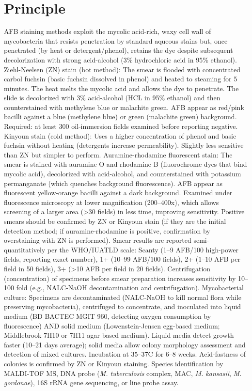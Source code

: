 \section*{Principle}
AFB staining methods exploit the mycolic acid-rich, waxy cell wall of mycobacteria that resists penetration by standard aqueous stains but, once penetrated (by heat or detergent/phenol), retains the dye despite subsequent decolorization with strong acid-alcohol (3\% hydrochloric acid in 95\% ethanol). Ziehl-Neelsen (ZN) stain (hot method): The smear is flooded with concentrated carbol fuchsin (basic fuchsin dissolved in phenol) and heated to steaming for 5 minutes. The heat melts the mycolic acid and allows the dye to penetrate. The slide is decolorized with 3\% acid-alcohol (HCL in 95\% ethanol) and then counterstained with methylene blue or malachite green. AFB appear as red/pink bacilli against a blue (methylene blue) or green (malachite green) background. Required: at least 300 oil-immersion fields examined before reporting negative. Kinyoun stain (cold method): Uses a higher concentration of phenol and basic fuchsin without heating (detergents increase permeability). Slightly less sensitive than ZN but simpler to perform. Auramine-rhodamine fluorescent stain: The smear is stained with auramine O and rhodamine B (fluorochrome dyes that bind mycolic acid), decolorized with acid-alcohol, and counterstained with potassium permanganate (which quenches background fluorescence). AFB appear as fluorescent yellow-orange bacilli against a dark background. Examined under fluorescence microscopy at lower magnification (200--400x), which allows screening of a larger area (>30 fields) in less time, improving sensitivity. Positive smears should be confirmed by ZN or Kinyoun stain (if they are the initial detection method; if auramine-rhodamine is positive, confirmation by overstaining with ZN is performed). Smear results are reported semi-quantitatively per the WHO/IUATLD scale: Scanty (1--9 AFB/100 high-power fields, reporting exact number), 1+ (10--99 AFB/100 fields), 2+ (1--10 AFB per field in 50 fields), 3+ (>10 AFB per field in 20 fields). Centrifugation (concentration) of specimens before smear preparation increases sensitivity by 10--100 fold (e.g., NALC-NaOH decontamination and centrifugation). Mycobacterial culture: Specimens are decontaminated (NALC-NaOH to kill normal flora while preserving mycobacteria), centrifuged to concentrate, and inoculated into liquid medium (BD BACTEC MGIT 960, detecting oxygen consumption by fluorescence) AND solid medium (Lowenstein-Jensen egg-based medium; Middlebrook 7H10 or 7H11 agar-based medium). Liquid media detect growth faster (10--21 days average); solid media allow colony morphology assessment and detection of mixed cultures. Incubation at 35--37\textdegree{}C for 6--8 weeks. Acid-fastness of colonies is confirmed by ZN or Kinyoun staining. Species identification by MALDI-TOF MS, DNA probe (\textit{M. tuberculosis} complex, MAC, \textit{M. kansasii}, \textit{M. gordonae}), 16S rRNA gene sequencing, or line probe assay.

